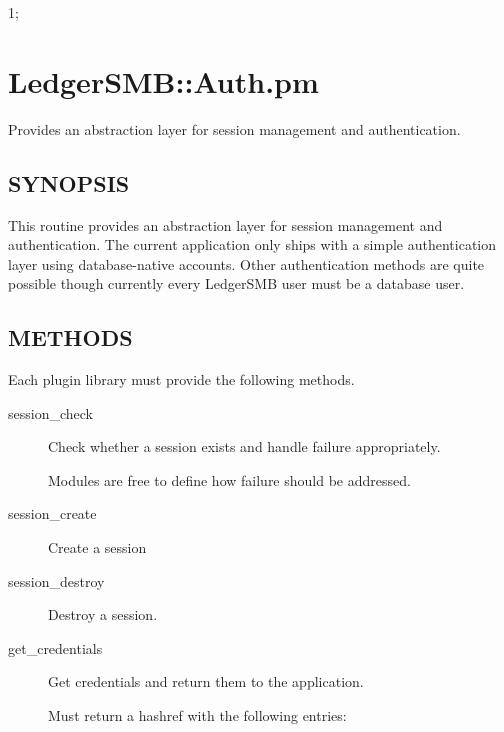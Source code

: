 \begin{description}
\begin{description}
\begin{description}
\begin{description}
\begin{description}
1;

\section{LedgerSMB::Auth.pm\label{LedgerSMB::Auth_pm}}


Provides an abstraction layer for session management and
authentication.

\subsection*{SYNOPSIS\label{LedgerSMB::Auth_pm_SYNOPSIS}}


This routine provides an abstraction layer for session management and
authentication.  The current application only ships with a simple authentication
layer using database-native accounts.  Other authentication methods are quite
possible though currently every LedgerSMB user must be a database user.

\subsection*{METHODS\label{LedgerSMB::Auth_pm_METHODS}}


Each plugin library must provide the following methods.

\begin{description}

\item[{session\_check}] \mbox{}

Check whether a session exists and handle failure appropriately.



Modules are free to define how failure should be addressed.


\item[{session\_create}] \mbox{}

Create a session


\item[{session\_destroy}] \mbox{}

Destroy a session.


\item[{get\_credentials}] \mbox{}

Get credentials and return them to the application.



Must return a hashref with the following entries:




\end{description}
\end{description}
\end{description}
\end{description}
\end{description}
\end{description}
